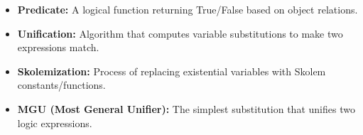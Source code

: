 \documentclass[12pt,a4paper]{article}
\begin{document}
\begin{tcolorbox}[defbox, title={\textbf{One-Line Definitions}}]
  \begin{itemize}[leftmargin=*, noitemsep]
    \item \textbf{Predicate:} A logical function returning True/False based on object relations.
    \item \textbf{Unification:} Algorithm that computes variable substitutions to make two expressions match.
    \item \textbf{Skolemization:} Process of replacing existential variables with Skolem constants/functions.
    \item \textbf{MGU (Most General Unifier):} The simplest substitution that unifies two logic expressions.
  \end{itemize}
\end{tcolorbox}
\end{document}
